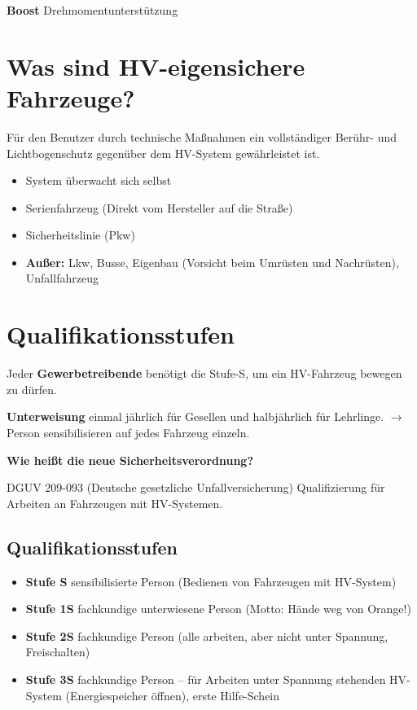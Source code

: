 \textbf{Boost} Drehmomentunterstützung

\section{Was sind HV-eigensichere
Fahrzeuge?}\label{was-sind-hv-eigensichere-fahrzeuge}

Für den Benutzer durch technische Maßnahmen ein vollständiger Berühr-
und Lichtbogenschutz gegenüber dem HV-System gewährleistet ist.

\begin{itemize}
\item
  System überwacht sich selbst
\item
  Serienfahrzeug (Direkt vom Hersteller auf die Straße)
\item
  Sicherheitslinie (Pkw)
\item
  \textbf{Außer:} Lkw, Busse, Eigenbau (Vorsicht beim Umrüsten und
  Nachrüsten), Unfallfahrzeug
\end{itemize}

\section{Qualifikationsstufen}\label{qualifikationsstufen}

Jeder \textbf{Gewerbetreibende} benötigt die Stufe-S, um ein HV-Fahrzeug
bewegen zu dürfen.

\textbf{Unterweisung} einmal jährlich für Gesellen und halbjährlich für
Lehrlinge. $\to$ Person sensibilisieren auf jedes Fahrzeug einzeln.

\textbf{Wie heißt die neue Sicherheitsverordnung?}

DGUV 209-093 (Deutsche gesetzliche Unfallversicherung) Qualifizierung
für Arbeiten an Fahrzeugen mit HV-Systemen.

\subsection{Qualifikationsstufen}\label{qualifikationsstufen-1}

\begin{itemize}
\item
  \textbf{Stufe S} sensibilisierte Person (Bedienen von Fahrzeugen mit
  HV-System)
\item
  \textbf{Stufe 1S} fachkundige unterwiesene Person (Motto: Hände weg
  von Orange!)
\item
  \textbf{Stufe 2S} fachkundige Person (alle arbeiten, aber nicht unter
  Spannung, Freischalten)
\item
  \textbf{Stufe 3S} fachkundige Person -- für Arbeiten unter Spannung
  stehenden HV-System (Energiespeicher öffnen), erste Hilfe-Schein
\end{itemize}

